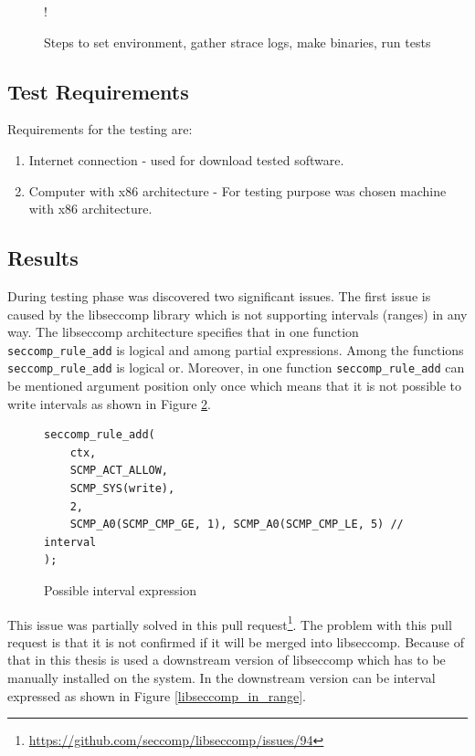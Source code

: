 \begin{figure}[H]
  \centering
   {!} {
    
  }
  \caption{Steps to set environment, gather strace logs, make binaries, run tests}
  \label{fig:tikz:setenv_architecture}
\end{figure}

\subsection{Test Requirements}
Requirements for the testing are:
\begin{enumerate}
	\item Internet connection - used for download tested software.
	\item Computer with x86 architecture - For testing purpose was chosen
	machine with x86 architecture.
\end{enumerate}

\subsection{Results} During testing phase was discovered two significant issues.
The first issue is caused by the libseccomp library which is not supporting
intervals (ranges) in any way. The libseccomp architecture specifies that in one
function \texttt{seccomp\_rule\_add} is logical and among partial expressions.
Among the functions \texttt{seccomp\_rule\_add} is logical or. Moreover, in one
function \texttt{seccomp\_rule\_add} can be mentioned argument position only
once which means that it is not possible to write intervals as shown in Figure
\ref{libseccomp_native}.

\begin{figure}[h]
	\label{libseccomp_native}
	\lstset{style=c++}
	\begin{lstlisting}
seccomp_rule_add(
	ctx,
	SCMP_ACT_ALLOW,
	SCMP_SYS(write),
	2,
	SCMP_A0(SCMP_CMP_GE, 1), SCMP_A0(SCMP_CMP_LE, 5) // interval
);
	\end{lstlisting}
	\caption{Possible interval expression}
\end{figure}

This issue was partially solved in this pull
request\footnote{\url{https://github.com/seccomp/libseccomp/issues/94}}. The
problem with this pull request is that it is not confirmed if it will be merged
into libseccomp. Because of that in this thesis is used a downstream version of
libseccomp which has to be manually installed on the system. In the downstream
version can be interval expressed as shown in Figure \ref{libseccomp_in_range}.

